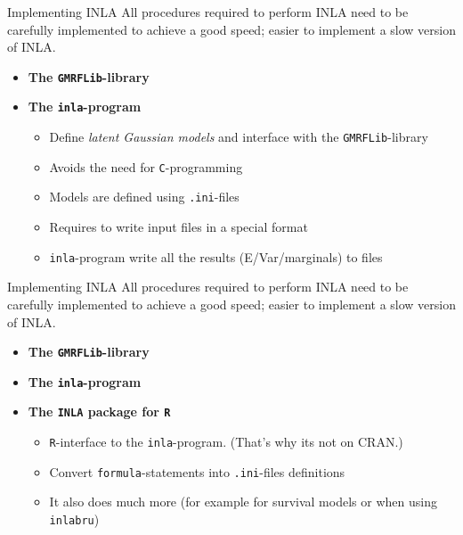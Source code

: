 \documentclass[
  ignorenonframetext,
]{beamer}
\providecommand{\tightlist}{%
  \setlength{\itemsep}{0pt}\setlength{\parskip}{0pt}}
\begin{document}
\begin{frame}[fragile]{Implementing INLA}
\protect\hypertarget{implementing-inla-1}{}
All procedures required to perform INLA need to be carefully implemented
to achieve a good speed; easier to implement a slow version of INLA.

\begin{itemize}
\item
  \textbf{The \texttt{GMRFLib}-library}
\item
  \textbf{The \texttt{inla}-program}

  \begin{itemize}
  \tightlist
  \item
    Define \emph{latent Gaussian models} and interface with the
    \texttt{GMRFLib}-library
  \item
    Avoids the need for \texttt{C}-programming
  \item
    Models are defined using \texttt{.ini}-files
  \item
    Requires to write input files in a special format
  \item
    \texttt{inla}-program write all the results (E/Var/marginals) to
    files
  \end{itemize}
\end{itemize}
\end{frame}

\begin{frame}[fragile]{Implementing INLA}
\protect\hypertarget{implementing-inla-2}{}
All procedures required to perform INLA need to be carefully implemented
to achieve a good speed; easier to implement a slow version of INLA.

\begin{itemize}
\item
  \textbf{The \texttt{GMRFLib}-library}
\item
  \textbf{The \texttt{inla}-program}
\item
  \textbf{The \texttt{INLA} package for \texttt{R}}

  \begin{itemize}
  \tightlist
  \item
    \texttt{R}-interface to the \texttt{inla}-program. (That's why its
    not on CRAN.)
  \item
    Convert \texttt{formula}-statements into \texttt{.ini}-files
    definitions
  \item
    It also does much more (for example for survival models or when
    using \texttt{inlabru})
  \end{itemize}
\end{itemize}
\end{frame}
\end{document}

